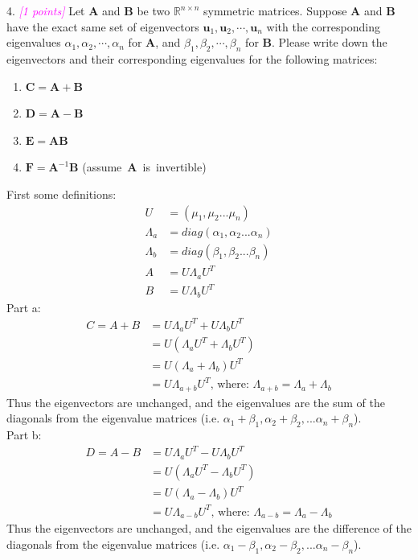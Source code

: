 \documentclass{article}
\newcommand{\field}[1]{\mathbb{#1}}
\newcommand{\1}{\mathbf{1}}
\newcommand{\R}{\field{R}} %
\newcommand{\vct}[1]{\boldsymbol{#1}} %
\newcommand{\mat}[1]{\boldsymbol{#1}} %
\newcommand{\grade}[1]{\small\textcolor{magenta}{\emph{[#1 points]}} \normalsize}
\begin{document}
{\color{blue}
4. \grade{1} Let $\mat{A}$ and $\mat{B}$ be two $\R^{n\times n}$ symmetric
matrices. Suppose $\mat{A}$ and $\mat{B}$ have the exact same set of eigenvectors
$\vct{u}_1, \vct{u}_2, \cdots, \vct{u}_n$ with the corresponding
eigenvalues $\alpha_1, \alpha_2, \cdots, \alpha_{n}$ for $\mat{A}$, and
$\beta_1, \beta_2, \cdots, \beta_{n}$ for $\mat{B}$. Please write down
the eigenvectors and their corresponding eigenvalues for the following matrices:
\begin{enumerate}
\item $\mat{C} = \mat{A}+\mat{B}$
\item $\mat{D} = \mat{A} - \mat{B}$
\item $\mat{E} = \mat{A}\mat{B}$
\item $\mat{F} = \mat{A}^{-1}\mat{B}$ (\mbox{assume $\mat{A}$ is invertible})
\end{enumerate}
}
First some definitions:
\begin{align}
    U & = (\mu_1, \mu_2 ... \mu_n) \\
    \Lambda_a & = diag(\alpha_1,\alpha_2...\alpha_n) \\
    \Lambda_b & = diag(\beta_1,\beta_2...\beta_n) \\
    A & = U\Lambda_aU^T\\
    B & = U\Lambda_bU^T 
\end{align}
Part a:
\begin{align}
    C = A + B & =  U\Lambda_aU^T +  U\Lambda_bU^T \\
    & =  U(\Lambda_aU^T +  \Lambda_bU^T) \\
    & =  U(\Lambda_a +  \Lambda_b)U^T \\
    & =  U\Lambda_{a+b}U^T \text{, where:  } \Lambda_{a+b} = \Lambda_a +  \Lambda_b
\end{align}
Thus the eigenvectors are unchanged, and the eigenvalues are the sum of the diagonals from the eigenvalue matrices (i.e. $\alpha_1 + \beta_1,\alpha_2 + \beta_2, ... \alpha_n + \beta_n $). \\

Part b: 
\begin{align}
    D = A - B & =  U\Lambda_aU^T -  U\Lambda_bU^T \\
    & =  U(\Lambda_aU^T -  \Lambda_bU^T) \\
    & =  U(\Lambda_a -  \Lambda_b)U^T \\
    & =  U\Lambda_{a-b}U^T \text{, where:  } \Lambda_{a-b} = \Lambda_a -  \Lambda_b
\end{align}
Thus the eigenvectors are unchanged, and the eigenvalues are the difference of the diagonals from the eigenvalue matrices (i.e. $\alpha_1 - \beta_1,\alpha_2 - \beta_2, ... \alpha_n - \beta_n $).  \\
\end{document}
